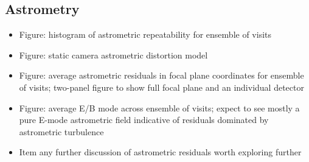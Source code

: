\subsection{Astrometry}
\label{sec:astrometry}

\begin{itemize}
    \item Figure: histogram of astrometric repeatability for ensemble of visits
    \item Figure: static camera astrometric distortion model
    \item Figure: average astrometric residuals in focal plane coordinates for ensemble of visits; two-panel figure to show full focal plane and an individual detector
    \item Figure: average E/B mode across ensemble of visits; expect to see mostly a pure E-mode astrometric field indicative of residuals dominated by astrometric turbulence
    \item Item any further discussion of astrometric residuals worth exploring further
\end{itemize}
